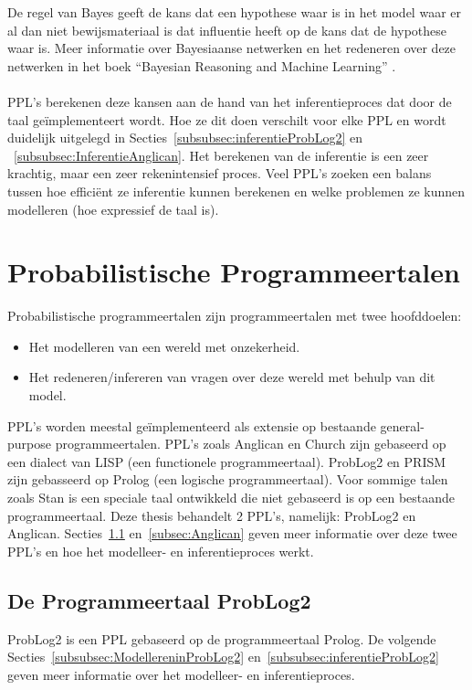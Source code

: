 \documentclass[12pt,a4paper,oneside]{book}
\theoremstyle{definition}
\newcommand{\quotes}[1]{``#1''}
\begin{document}
De regel van Bayes geeft de kans dat een hypothese waar is in het model waar er al dan niet bewijsmateriaal is dat influentie heeft op de kans dat de hypothese waar is. Meer informatie over Bayesiaanse netwerken en het redeneren over deze netwerken in het boek \quotes{Bayesian Reasoning and Machine Learning} \cite{barberBRML2012}. 
\\\\
PPL's berekenen deze kansen aan de hand van het inferentieproces dat door de taal ge\"{i}mplementeert wordt. Hoe ze dit doen verschilt voor elke PPL en wordt duidelijk uitgelegd in Secties~\ref{subsubsec:inferentieProbLog2} en ~\ref{subsubsec:InferentieAnglican}. Het berekenen van de inferentie is een zeer krachtig, maar een zeer rekenintensief proces. Veel PPL's zoeken een balans tussen hoe effici\"{e}nt ze inferentie kunnen berekenen en welke problemen ze kunnen modelleren (hoe expressief de taal is).

\section{Probabilistische Programmeertalen}
Probabilistische programmeertalen zijn programmeertalen met twee hoofddoelen:
\begin{itemize}
  \item Het modelleren van een wereld met onzekerheid.
  \item Het redeneren/infereren van vragen over deze wereld met behulp van dit model.
\end{itemize}
PPL's worden meestal ge\"{i}mplementeerd als extensie op bestaande general-purpose programmeertalen. PPL's zoals Anglican en Church zijn gebaseerd op een dialect van LISP (een functionele programmeertaal). ProbLog2 en PRISM zijn gebasseerd op Prolog (een logische programmeertaal). Voor sommige talen zoals Stan is een speciale taal ontwikkeld die niet gebaseerd is op een bestaande programmeertaal.
Deze thesis behandelt 2 PPL's, namelijk: ProbLog2 en Anglican. Secties~\ref{subsec:ProbLog2} en~\ref{subsec:Anglican} geven meer informatie over deze twee PPL's en hoe het modelleer- en inferentieproces werkt.
\subsection{De Programmeertaal ProbLog2}
\label{subsec:ProbLog2}
ProbLog2 is een PPL gebaseerd op de programmeertaal Prolog. De volgende Secties~\ref{subsubsec:ModellereninProbLog2} en~\ref{subsubsec:inferentieProbLog2} geven meer informatie over het modelleer- en inferentieproces.
\end{document}
